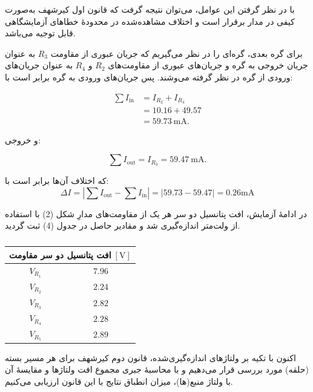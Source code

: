\documentclass[a4paper, 11pt]{article}
\begin{document}
با در نظر گرفتن این عوامل، می‌توان نتیجه گرفت که قانون اول کیرشهف به‌صورت کیفی در مدار برقرار است و اختلاف مشاهده‌شده در محدودهٔ خطاهای آزمایشگاهی قابل توجیه می‌باشد.

برای گره بعدی، گره‌ای را در نظر می‌گیریم که جریان عبوری از مقاومت $R_3$ به عنوان جریان خروجی به گره و جریان‌های عبوری از مقاومت‌های $R_2$ و $R_4$ به عنوان جریان‌های ورودی از گره در نظر گرفته می‌وشند. پس جریان‌های ورودی به گره برابر است با:

\begin{align}
\sum I_{\text{in}} &= I_{R_2} + I_{R_4} \nonumber\\
&= 10.16 + 49.57 \nonumber\\
&= 59.73~\mathrm{mA}.
\end{align}

و خروجی:

\begin{equation}
\sum I_{\text{out}} = I_{R_3} = 59.47~\mathrm{mA}.
\end{equation}

که اختلاف آن‌ها برابر است با:
\begin{equation}
\Delta I = \left| \sum I_{\text{out}} - \sum I_{\text{in}} \right|
= | 59.73 - 59.47 |
= 0.26 \mathrm{mA}
\end{equation}

در ادامهٔ آزمایش، افت پتانسیل دو سر هر یک از مقاومت‌های مدارِ شکل (2) با استفاده از ولت‌متر اندازه‌گیری شد و مقادیر حاصل در جدول (4) ثبت گردید. 

\begin{table}[h!]
\caption{}
\label{tab3}
\centering
\begin{tabular}{cc}
\hline
\multicolumn{2}{c}{افت پتانسیل دو سر مقاومت$\;[\mathrm{V}]$} \\
\hline
$V_{R_1}$ & $7.96$ \\
$V_{R_2}$ & $2.24$ \\
$V_{R_3}$ & $2.82$ \\
$V_{R_4}$ & $2.28$ \\
$V_{R_5}$ & $2.89$ \\
\hline
\end{tabular}
\end{table}

اکنون با تکیه بر ولتاژهای اندازه‌گیری‌شده، قانون دوم کیرشهف برای هر مسیر بسته (حلقه) مورد بررسی قرار می‌دهیم و با محاسبهٔ جبری مجموع افت ولتاژها و مقایسهٔ آن با ولتاژ منبع(ها)، میزان انطباق نتایج با این قانون ارزیابی می‌کنیم.
\end{document}
